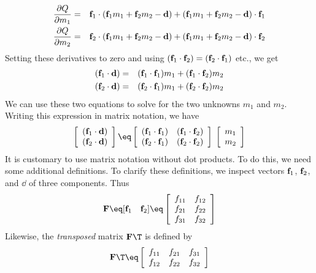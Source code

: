 \begin{eqnarray} \label{eqn:Q1comp}
 {\partial Q \over \partial m_1} &= &
                    {\bf f}_1  \cdot ({\bf f}_1 m_1 + {\bf f}_2 m_2 -{\bf d} )  
                         +        ({\bf f}_1 m_1 + {\bf f}_2 m_2 -{\bf d} ) \cdot  {\bf f}_1
 \\
 {\partial Q \over \partial m_2} &= &
                            {\bf f}_2  \cdot ({\bf f}_1 m_1 + {\bf f}_2 m_2 -{\bf d} )  
                         +   ({\bf f}_1 m_1 + {\bf f}_2 m_2 -{\bf d} ) \cdot  {\bf f}_2
\end{eqnarray}
Setting these derivatives to zero and using
$({\bf f}_1 \cdot {\bf f}_2)=({\bf f}_2 \cdot {\bf f}_1)$ etc.,
we get
\begin{eqnarray}
({\bf f}_1 \cdot {\bf d} ) &= & ({\bf f}_1 \cdot {\bf f}_1) m_1 + ({\bf f}_1 \cdot {\bf f}_2)  m_2  \\
({\bf f}_2 \cdot {\bf d} ) &= & ({\bf f}_2 \cdot {\bf f}_1) m_1 + ({\bf f}_2 \cdot {\bf f}_2)  m_2
\end{eqnarray}
We can use these two equations to solve for
the two unknowns $m_1$ and $m_2$.
Writing this expression in matrix notation, we have
\begin{equation}
\left[ 
\begin{array}{c}
  (\ff_1 \cdot \dd ) \\ 
  (\ff_2 \cdot \dd ) \end{array} \right] 
\eq \left[ 
\begin{array}{ccc}
  (\ff_1 \cdot \ff_1) & (\ff_1 \cdot \ff_2)  \\
  (\ff_2 \cdot \ff_1) & (\ff_2 \cdot \ff_2)  \end{array} \right] 
\; \left[ 
\begin{array}{c}
  m_1 \\ 
  m_2 \end{array} \right]  \label{eqn:2by2}
\end{equation}
It is customary to use matrix notation without dot products.
To do this, we need some additional definitions.
To clarify these definitions,
we inspect vectors 
${\bf f}_1$, ${\bf f}_2$, and $\dd$ of three components.
Thus 
\begin{equation}
\bold F \eq [ \ff_1 \quad \ff_2 ] \eq 
\left[ 
\begin{array}{ccc}
  f_{11} & f_{12}  \\
  f_{21} & f_{22}  \\
  f_{31} & f_{32}  \end{array} \right] 
\end{equation}
Likewise, the {\it transposed} matrix $\bold F\T$ is defined by
\begin{equation}
\bold F\T \eq
\left[ 
\begin{array}{ccc}
  f_{11} & f_{21} & f_{31}  \\
  f_{12} & f_{22} & f_{32}  \end{array} \right] 
\end{equation}
